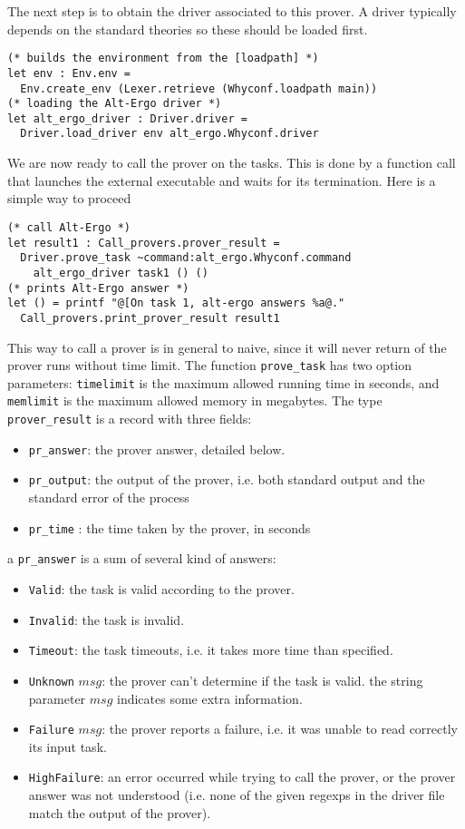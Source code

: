 The next step is to obtain the driver associated to this prover. A driver typically depends on the standard theories so these should be loaded first.
\begin{verbatim}
(* builds the environment from the [loadpath] *)
let env : Env.env = 
  Env.create_env (Lexer.retrieve (Whyconf.loadpath main)) 
(* loading the Alt-Ergo driver *)
let alt_ergo_driver : Driver.driver = 
  Driver.load_driver env alt_ergo.Whyconf.driver
\end{verbatim}

We are now ready to call the prover on the tasks. This is done by a
function call that launches the external executable and waits for its
termination. Here is a simple way to proceed
\begin{verbatim}
(* call Alt-Ergo *)
let result1 : Call_provers.prover_result = 
  Driver.prove_task ~command:alt_ergo.Whyconf.command
    alt_ergo_driver task1 () ()
(* prints Alt-Ergo answer *)
let () = printf "@[On task 1, alt-ergo answers %a@."
  Call_provers.print_prover_result result1
\end{verbatim}
This way to call a prover is in general to naive, since it will never return
of the prover runs without time limit. The function \texttt{prove\_task} has two option parameters: \texttt{timelimit} is the maximum allowed running time in seconds, and \texttt{memlimit} is the maximum allowed memory in megabytes. 
The type \texttt{prover\_result} is a record with three fields:
\begin{itemize}
\item \texttt{pr\_answer}: the prover answer, detailed below.
\item \texttt{pr\_output}: the output of the prover, i.e. both standard output and the standard error of the process
\item \texttt{pr\_time} : the time taken by the prover, in seconds
\end{itemize}
a \texttt{pr\_answer} is a sum of several kind of answers:
\begin{itemize}
\item \texttt{Valid}: the task is valid according to the prover.
\item \texttt{Invalid}: the task is invalid.
\item \texttt{Timeout}: the task timeouts, i.e. it takes more time than specified.
\item \texttt{Unknown} $msg$: the prover can't determine if the task is valid. the string parameter $msg$ indicates some extra information.
\item \texttt{Failure} $msg$: the prover reports a failure, i.e. it was unable to read correctly its input task.
\item \texttt{HighFailure}: an error occurred while trying to call the prover,
or the prover answer was not understood (i.e. none of the given regexps in the driver file match the output of the prover).
\end{itemize}
